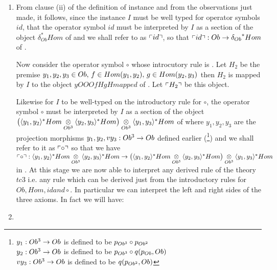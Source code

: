 \begin{enumerate}[$tc_1$]
\item 
From clause (ii) of the definition of instance and from the observations just  made, it
follows, since the instance $I$ must be well typed for operator symbols $id$,
that the operator symbol $id$ must be interpreted by $I$ as a section of the object $\delta_{Ob}^*Hom$ of \catcw
and we shall refer to as $\left\ulcorner id\right\urcorner$, so that $\left\ulcorner id\right\urcorner : Ob \rightarrow {\delta_{Ob}}^*Hom$ of \catc. 

Now consider the operator symbol $\circ$ whose introcutory rule is
.
Let $H_2$ be the premise $y_1,y_2,y_3 \in Ob,\,f \in Hom(y_1,y_2),\,g \in Hom(y_2,y_3)$ then $H_2$ is mapped by $I$ to the object $yOOOfHgHmapped$ of \catc.
Let $\left\ulcorner H_2\right\urcorner$ be this object. 
 

Likewise for $I$ to be well-typed on the introductory rule for $\circ$, the operator symbol $\circ$ must be interpreted by $I$ as a section of the object 
$\big(\langle y_1,y_2\rangle^*Hom \underset{Ob^3}{\otimes} \langle y_2,y_3\rangle^*Hom\big) \underset{Ob^3}{\otimes} {\langle y_1,y_3\rangle^*Hom}$ of \catcw 
where $y_1,y_2,y_3$ are the projection morphisms $y_1,y_2,vy_3: Ob^3 \rightarrow Ob$ defined earlier (\tbd\footnote{
$y_1: Ob^3 \rightarrow Ob$ is defined to be $p_{Ob^3} \circ p_{Ob^2}$ \\
$y_2: Ob^3 \rightarrow Ob$ is defined to be $p_{Ob^3} \circ q(p_{Ob},Ob)$\\
$vy_3: Ob^3 \rightarrow Ob$ is defined to be $q(p_{Ob^2},Ob)$
}) and we shall refer to it as $\left\ulcorner\circ\right\urcorner$ so that we have $\left\ulcorner\circ\right\urcorner: \langle y_1,y_2\rangle^*Hom \underset{Ob^3}{\otimes} \langle y_2,y_3\rangle^*Hom \rightarrow \big(\langle y_1,y_2\rangle^*Hom \underset{Ob^3}{\otimes} \langle y_2,y_3\rangle^*Hom\big) \underset{Ob^3}{\otimes} {\langle y_1,y_3\rangle^*Hom}$ in \catc.
At this stage we are now able to interpret any derived rule of the theory $tc3$ i.e. any rule 
which can be derived just from the introductory rules for $Ob, Hom, id and \circ$. In particular we can
interpret the left and right sides of the three axioms. In fact we will have: 

 
\item %
\end{enumerate}
\fi


\newcommand{\gatinterpretationcontext}[1]{&\multicolumn{5}{p{15cm}}{#1}}


\newcommand{\compfour}{\tuple{y_1,y_2}^*Hom}
\newcommand{\compfive}{\tuple{\dot y_2,\dot y_3}^*Hom}
\newcommand{\compsix}{\tuple{\ddot y_1,\ddot y_3}^*Hom}


\newcommand{\leftidentitymapped}{\tuple{x_1,x_1,x_2,x_1\circ \fid,id_{Hom}}^*\fcomp=s(id_{Hom})}

\newcommand{\rightidentitymapped}{\tuple{x_1,x_1,x_2,id_{Hom},x_2\circ \fid}^*\fcomp=s(id_{Hom})}


